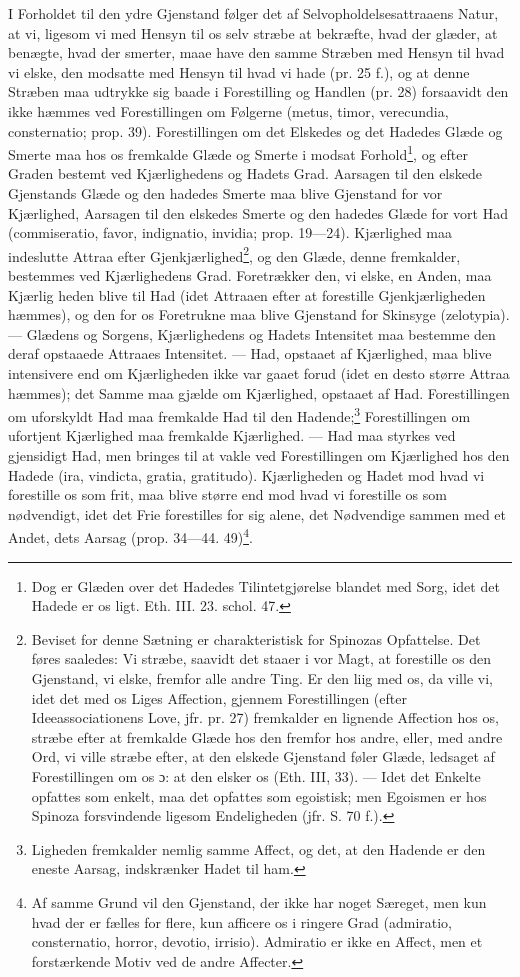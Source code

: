 \documentclass[12pt,a4paper]{book}
\newcommand{\opage}[1]{\marginnote{\footnotesize\textit{[#1]}}}
\begin{document}
I Forholdet til den ydre Gjenstand følger det af Selvopholdelsesattraaens
Natur, at vi, ligesom vi med Hensyn
til os selv stræbe at bekræfte, hvad der glæder, at benægte,
hvad der smerter, maae have den samme Stræben med Hensyn
til hvad vi elske, den modsatte med Hensyn til hvad
vi hade (pr. 25 f.), og at denne Stræben maa udtrykke sig
baade i Forestilling og Handlen (pr. 28) forsaavidt den ikke
hæmmes ved Forestillingen om Følgerne (metus, timor, verecundia,
consternatio; prop. 39). Forestillingen om det
Elskedes og det Hadedes Glæde og Smerte maa hos os
fremkalde Glæde og Smerte i modsat
Forhold\footnote{Dog er Glæden over det Hadedes
Tilintetgjørelse blandet med Sorg, idet det Hadede er os
ligt. Eth. III. 23. schol. 47.}, og efter
Graden bestemt ved Kjærlighedens og Hadets Grad. Aarsagen
til den elskede Gjenstands Glæde og den hadedes
Smerte maa blive Gjenstand for vor Kjærlighed, Aarsagen
til den elskedes Smerte og den hadedes Glæde for vort
Had (commiseratio, favor, indignatio, invidia; prop. 19---24).
Kjærlighed maa indeslutte Attraa efter
Gjenkjærlighed\footnote{Beviset for denne Sætning er
charakteristisk for Spinozas Opfattelse. Det føres saaledes:
Vi stræbe, saavidt det staaer i vor Magt, at forestille os den
Gjenstand, vi elske, fremfor alle andre Ting. Er den liig med
os, da ville vi, idet det med os Liges Affection, gjennem
Forestillingen (efter Ideeassociationens Love, jfr. pr. 27)
fremkalder en lignende Affection hos os, stræbe efter at
fremkalde Glæde hos den fremfor hos andre, eller, med andre
Ord, vi ville stræbe efter, at den elskede Gjenstand føler
Glæde, ledsaget af Forestillingen om os ɔ: at den elsker os
(Eth. III, 33). --- Idet det Enkelte opfattes som enkelt, maa
det opfattes som egoistisk; men Egoismen er hos Spinoza
forsvindende ligesom Endeligheden (jfr. S. 70 f.).}, og
den Glæde, denne fremkalder, bestemmes ved Kjærlighedens
Grad. Foretrækker den, vi elske, en Anden, maa Kjærlig\-%
\opage{117}\setcounter{footnote}{0}%
heden blive til Had (idet Attraaen efter at forestille Gjenkjærligheden
hæmmes), og den for os Foretrukne maa blive
Gjenstand for Skinsyge (zelotypia). --- Glædens og Sorgens,
Kjærlighedens og Hadets Intensitet maa bestemme den deraf
opstaaede Attraaes Intensitet. --- Had, opstaaet af Kjærlighed,
maa blive intensivere end om Kjærligheden ikke var
gaaet forud (idet en desto større Attraa hæmmes); det
Samme maa gjælde om Kjærlighed, opstaaet af Had. Forestillingen
om uforskyldt Had maa fremkalde Had til den
Hadende;\footnote{Ligheden fremkalder nemlig samme
Affect, og det, at den Hadende er den eneste Aarsag,
indskrænker Hadet til ham.} Forestillingen om ufortjent Kjærlighed maa fremkalde
Kjærlighed. --- Had maa styrkes ved gjensidigt Had,
men bringes til at vakle ved Forestillingen om Kjærlighed
hos den Hadede (ira, vindicta, gratia, gratitudo). Kjærligheden
og Hadet mod hvad vi forestille os som frit, maa
blive større end mod hvad vi forestille os som nødvendigt,
idet det Frie forestilles for sig alene, det Nødvendige sammen
med et Andet, dets
Aarsag (prop. 34---44.
49)\footnote{Af samme Grund vil den Gjenstand, der ikke
har noget Særeget, men kun hvad der er fælles for flere, kun
afficere os i ringere Grad (admiratio, consternatio, horror,
devotio, irrisio). Admiratio er ikke en Affect, men et
forstærkende Motiv ved de andre Affecter.}.
\end{document}
